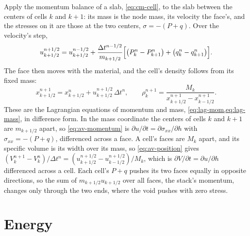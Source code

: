 Apply the momentum balance of a slab, \cref{eq:cm-cell}, to the slab
between the centers of cells $k$ and $k + 1$: its mass is the node mass,
its velocity the face's, and the stresses on it are those at the two
centers, $\sigma = -(P + q)$. Over the velocity's step,
\begin{equation}
u^{n+1/2}_{k+1/2} = u^{n-1/2}_{k+1/2}
  + \frac{\Delta t^{n-1/2}}{m_{k+1/2}}
    \Bigl[\bigl(P^n_k - P^n_{k+1}\bigr) + \bigl(q^n_k - q^n_{k+1}\bigr)\Bigr].
\label{eq:av-momentum}
\end{equation}
The face then moves with the material, and the cell's density follows from
its fixed mass:
\begin{equation}
x^{n+1}_{k+1/2} = x^n_{k+1/2} + u^{n+1/2}_{k+1/2}\,\Delta t^n,
\qquad
\rho^{n+1}_k = \frac{M_k}{x^{n+1}_{k+1/2} - x^{n+1}_{k-1/2}} .
\label{eq:av-position}
\end{equation}
These are the Lagrangian equations of momentum and mass,
\cref{eq:lag-mom,eq:lag-mass}, in difference form. In the mass coordinate
the centers of cells $k$ and $k + 1$ are $m_{k+1/2}$ apart, so
\cref{eq:av-momentum} is $\partial u/\partial t = \partial\sigma_{xx}/\partial
h$ with $\sigma_{xx} = -(P + q)$, differenced across a face. A cell's faces
are $M_k$ apart, and its specific volume is its width over its mass, so
\cref{eq:av-position} gives $(V^{n+1}_k - V^n_k)/\Delta t^n = (u^{n+1/2}_{k+1/2}
- u^{n+1/2}_{k-1/2})/M_k$, which is $\partial V/\partial t = \partial
u/\partial h$ differenced across a cell. Each cell's $P + q$ pushes its two
faces equally in opposite directions, so the sum of $m_{k+1/2}u_{k+1/2}$
over all faces, the stack's momentum, changes only through the two ends,
where the void pushes with zero stress.

\section{Energy}
\label{sec:av-energy}

